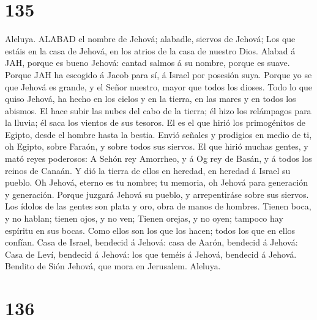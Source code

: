 \hypertarget{section-134}{%
\section{135}\label{section-134}}

 Aleluya. ALABAD el nombre de Jehová; alabadle, siervos de
Jehová;  Los que estáis en la casa de Jehová, en los atrios
de la casa de nuestro Dios.  Alabad á JAH, porque es bueno
Jehová: cantad salmos á su nombre, porque es suave.  Porque
JAH ha escogido á Jacob para sí, á Israel por posesión suya.
 Porque yo se que Jehová es grande, y el Señor nuestro,
mayor que todos los dioses.  Todo lo que quiso Jehová, ha
hecho en los cielos y en la tierra, en las mares y en todos los abismos.
 El hace subir las nubes del cabo de la tierra; él hizo los
relámpagos para la lluvia; él saca los vientos de sus tesoros.
 El es el que hirió los primogénitos de Egipto, desde el
hombre hasta la bestia.  Envió señales y prodigios en medio
de ti, oh Egipto, sobre Faraón, y sobre todos sus siervos. 
El que hirió muchas gentes, y mató reyes poderosos:  A
Sehón rey Amorrheo, y á Og rey de Basán, y á todos los reinos de Canaán.
 Y dió la tierra de ellos en heredad, en heredad á Israel
su pueblo.  Oh Jehová, eterno es tu nombre; tu memoria, oh
Jehová para generación y generación.  Porque juzgará Jehová
su pueblo, y arrepentiráse sobre sus siervos.  Los ídolos
de las gentes son plata y oro, obra de manos de hombres. 
Tienen boca, y no hablan; tienen ojos, y no ven;  Tienen
orejas, y no oyen; tampoco hay espíritu en sus bocas.  Como
ellos son los que los hacen; todos los que en ellos confían.
 Casa de Israel, bendecid á Jehová: casa de Aarón, bendecid
á Jehová:  Casa de Leví, bendecid á Jehová: los que teméis
á Jehová, bendecid á Jehová.  Bendito de Sión Jehová, que
mora en Jerusalem. Aleluya.

\hypertarget{section-135}{%
\section{136}\label{section-135}}

